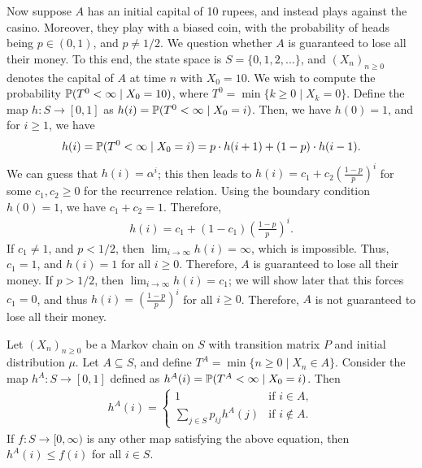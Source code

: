 Now suppose $A$ has an initial capital of 10 rupees, and instead plays against the casino. Moreover, they play with a biased coin, with the probability of heads being $p \in (0,1)$, and $p \neq 1/2$. We question whether $A$ is guaranteed to lose all their money. To this end, the state space is $S = \{0,1,2,\ldots\}$, and $(X_{n})_{n \geq 0}$ denotes the capital of $A$ at time $n$ with $X_{0} = 10$. We wish to compute the probability $\mathbb{P}(T^{0} < \infty \mid X_{0}=10)$, where $T^{0} = \min\{k \geq 0 \mid X_{k} = 0\}$. Define the map $h:S \to [0,1]$ as $h(i) = \mathbb{P}(T^{0} < \infty \mid X_{0}=i)$. Then, we have $h(0) = 1$, and for $i \geq 1$, we have
\begin{align}
    h(i) = \mathbb{P}(T^{0} < \infty \mid X_{0}=i) = p \cdot h(i+1) + (1-p) \cdot h(i-1).
\end{align}
We can guess that $h(i) = \alpha^{i}$; this then leads to $h(i) = c_{1} + c_{2}\left(\frac{1-p}{p}\right)^{i}$ for some $c_{1},c_{2} \geq 0$ for the recurrence relation. Using the boundary condition $h(0) = 1$, we have $c_{1} + c_{2} = 1$. Therefore,
\begin{align}
    h(i) = c_{1}+(1-c_{1})\left(\frac{1-p}{p}\right)^{i}.
\end{align}
If $c_{1} \neq 1$, and $p < 1/2$, then $\lim_{i \to \infty} h(i) = \infty$, which is impossible. Thus, $c_{1} = 1$, and $h(i) = 1$ for all $i \geq 0$. Therefore, $A$ is guaranteed to lose all their money. If $p > 1/2$, then $\lim_{i \to \infty} h(i) = c_{1}$; we will show later that this forces $c_{1} = 0$, and thus $h(i) = \left(\frac{1-p}{p}\right)^{i}$ for all $i \geq 0$. Therefore, $A$ is not guaranteed to lose all their money.

\begin{theorem}
    Let $(X_{n})_{n \geq 0}$ be a Markov chain on $S$ with transition matrix $P$ and initial distribution $\mu$. Let $A \subseteq S$, and define $T^{A} = \min\{n \geq 0 \mid X_{n} \in A\}$. Consider the map $h^{A}:S \to [0,1]$ defined as $h^{A}(i) = \mathbb{P}(T^{A} < \infty \mid X_{0}=i)$. Then
    \begin{align}
        h^{A}(i) = \begin{cases}
            1 &\text{if } i \in A,\\
            \sum_{j \in S} p_{ij}h^{A}(j) &\text{if } i \notin A.
        \end{cases}
    \end{align}
    If $f:S \to [0,\infty)$ is any other map satisfying the above equation, then $h^{A}(i) \leq f(i)$ for all $i \in S$.
\end{theorem}

